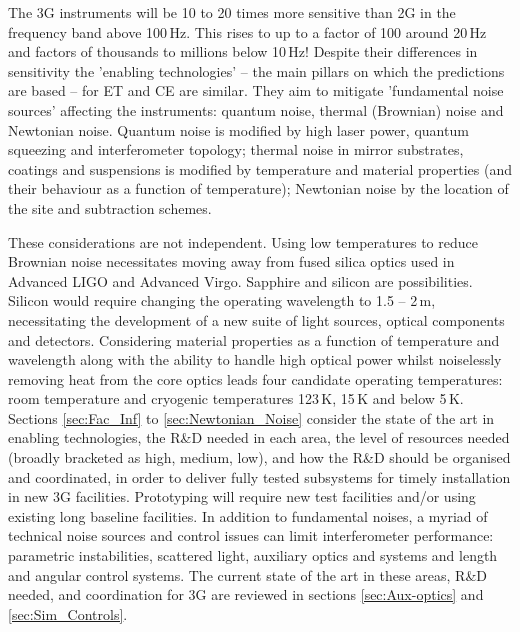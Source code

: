 The 3G instruments will be 10 to 20 times more sensitive than 2G in the frequency band above  100\,Hz.  This rises to up to a factor of 100 around 20\,Hz and factors of thousands to millions below 10\,Hz!  Despite their differences in sensitivity the 'enabling technologies' -- the main pillars on which the predictions are based -- for ET and CE are similar. They aim to mitigate 'fundamental noise sources' affecting the instruments:  quantum noise, thermal (Brownian) noise and Newtonian noise. 
Quantum noise is modified by high laser power, quantum squeezing and interferometer topology; thermal noise in mirror substrates, coatings and suspensions is modified by temperature and material properties (and their behaviour as a function of temperature); Newtonian noise by the location of the site and subtraction schemes.  

These considerations are not independent. Using low temperatures to reduce Brownian noise necessitates moving away from fused silica optics used in Advanced LIGO and Advanced Virgo. Sapphire and silicon are possibilities. Silicon would require changing the operating wavelength to 1.5 -- 2\,\micro m, necessitating the development of a new suite of light sources, optical components and detectors.  Considering material properties as a function of temperature and wavelength along with the ability to handle high optical power whilst noiselessly removing heat from the core optics leads four candidate operating temperatures:  room temperature and cryogenic temperatures 123\,K, 15\,K and below 5\,K.  Sections \ref{sec:Fac_Inf} to \ref{sec:Newtonian_Noise} consider the state of the art in enabling technologies, the R\&D needed in each area, the level of resources needed (broadly bracketed as high, medium, low), and how the R\&D should be organised and coordinated, in order to deliver fully tested subsystems for  timely installation in new 3G facilities. Prototyping will require new test facilities and/or using existing long baseline facilities.
In addition to fundamental noises, a myriad of technical noise sources and control issues can limit interferometer performance:  parametric instabilities, scattered light, auxiliary optics and systems and length and angular control systems.  The current state of the art in these areas, R\&D needed, and coordination for 3G are reviewed in sections \ref{sec:Aux-optics} and \ref{sec:Sim_Controls}. 

